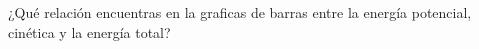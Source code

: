 ¿Qué relación encuentras en la graficas de barras entre la energía potencial, cinética y la energía total?


\begin{solutionbox}{1.2cm}

\end{solutionbox}
